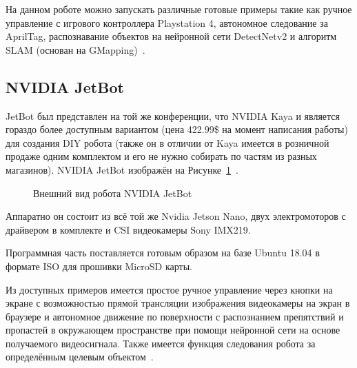 На данном роботе можно запускать различные готовые примеры такие как ручное управление с игрового контроллера Playstation 4, автономное следование
за AprilTag, распознавание объектов на нейронной сети DetectNetv2 и алгоритм SLAM (основан на GMapping)~\cite{isaac-kaya}.

\subsection{NVIDIA JetBot}

JetBot был представлен на той же конференции, что NVIDIA Kaya и является гораздо более доступным вариантом (цена 422.99\$ на момент написания работы) для создания DIY робота (также он в отличии от Kaya имеется в розничной продаже одним комплектом и его не нужно собирать по частям из разных магазинов). NVIDIA JetBot изображён на Рисунке~\cref{fig:jetbot}~\cite{jetbot}.

\begin{figure}[ht]
    \caption{Внешний вид робота NVIDIA JetBot}\label{fig:jetbot}
\end{figure}

Аппаратно он состоит из всё той же Nvidia Jetson Nano, двух электромоторов с драйвером в комплекте и CSI видеокамеры Sony IMX219. 

Программная часть поставляется готовым образом на базе Ubuntu 18.04 в формате ISO для прошивки MicroSD карты.

Из доступных примеров имеется простое ручное управление через кнопки на экране с возможностью прямой трансляции изображения видеокамеры на экран в браузере и автономное движение по поверхности с распознанием препятствий и пропастей в окружающем пространстве при помощи нейронной сети на основе получаемого видеосигнала. Также имеется функция следования робота за определённым целевым объектом~\cite{jetbot-examples}.

\FloatBarrier
